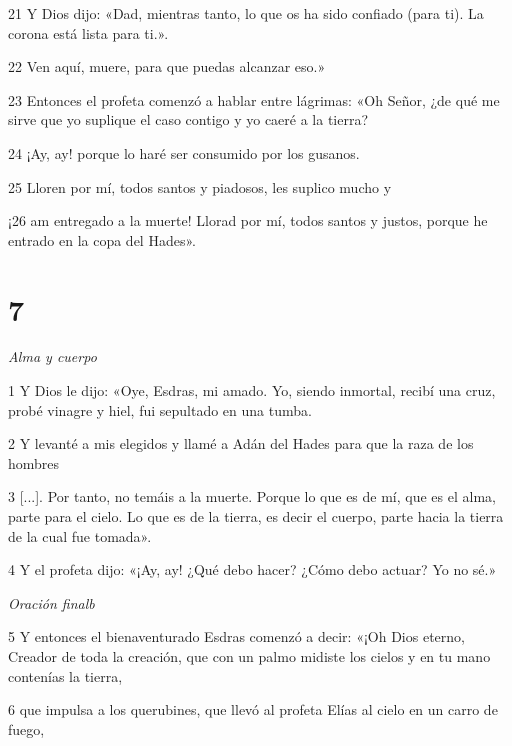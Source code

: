 \par 21 Y Dios dijo: «Dad, mientras tanto, lo que os ha sido confiado (para ti). La corona está lista para ti.».

\par 22 Ven aquí, muere, para que puedas alcanzar eso.»

\par 23 Entonces el profeta comenzó a hablar entre lágrimas: «Oh Señor, ¿de qué me sirve que yo suplique el caso contigo y yo caeré a la tierra?

\par 24 ¡Ay, ay! porque lo haré ser consumido por los gusanos.

\par 25 Lloren por mí, todos santos y piadosos, les suplico mucho y

\par ¡26 am entregado a la muerte! Llorad por mí, todos santos y justos, porque he entrado en la copa del Hades».

\chapter{7}

\par \textit{Alma y cuerpo}

\par 1 Y Dios le dijo: «Oye, Esdras, mi amado. Yo, siendo inmortal, recibí una cruz, probé vinagre y hiel, fui sepultado en una tumba.

\par 2 Y levanté a mis elegidos y llamé a Adán del Hades para que la raza de los hombres

\par 3 [...]. Por tanto, no temáis a la muerte. Porque lo que es de mí, que es el alma, parte para el cielo. Lo que es de la tierra, es decir el cuerpo, parte hacia la tierra de la cual fue tomada».

\par 4 Y el profeta dijo: «¡Ay, ay! ¿Qué debo hacer? ¿Cómo debo actuar? Yo no sé.»

\par \textit{Oración finalb}

\par 5 Y entonces el bienaventurado Esdras comenzó a decir: «¡Oh Dios eterno, Creador de toda la creación, que con un palmo midiste los cielos y en tu mano contenías la tierra,

\par 6 que impulsa a los querubines, que llevó al profeta Elías al cielo en un carro de fuego,


